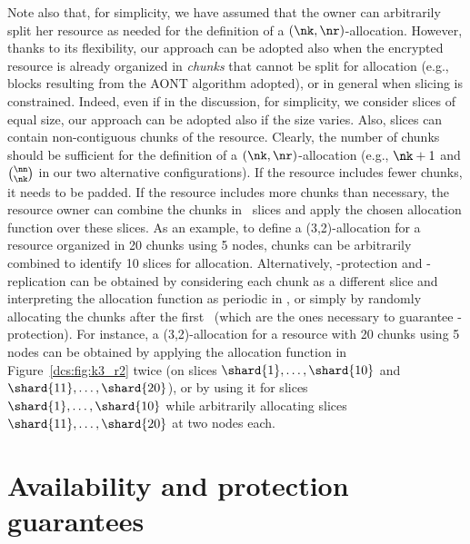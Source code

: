 Note also that, for simplicity, we have assumed that the owner can
arbitrarily split her resource as needed for the definition of a
$(\nk,\nr)$-allocation. However, thanks to its flexibility, our
approach can be adopted also when the encrypted resource is already
organized in {\em chunks} that cannot be split for allocation (e.g.,
blocks resulting from the AONT algorithm adopted), or in general when
slicing is constrained. Indeed, even if in the discussion, for
simplicity, we consider slices of equal size, our approach can be
adopted also if the size varies.  Also, slices can contain
non-contiguous chunks of the resource. Clearly, the number of chunks
should be sufficient for the definition of a $(\nk,\nr)$-allocation
(e.g., $\nk+1$ and $\binom{\nn}{\nk}$ in our two alternative
configurations). If the resource includes fewer chunks, it needs to be
padded. If the resource includes more chunks than necessary, the
resource owner can combine the chunks in \ns\ slices and apply the
chosen allocation function over these slices. As an example, to define
a (3,2)-allocation for a resource organized in 20 chunks using 5
nodes, chunks can be arbitrarily combined to identify 10 slices for
allocation. Alternatively, \nk-protection and \nr-replication can be
obtained by considering each chunk as a different slice and
interpreting the allocation function as periodic in \ns, or simply by
randomly allocating the chunks after the first \ns\ (which are the
ones necessary to guarantee \nk-protection). For instance, a
(3,2)-allocation for a resource with 20 chunks using 5 nodes can be
obtained by applying the allocation function in Figure~\ref{dcs:fig:k3_r2}
twice (on slices $\shard{1},\ldots,\shard{10}$ and
$\shard{11},\ldots,\shard{20}$), or by using it for slices
$\shard{1},\ldots,\shard{10}$ while arbitrarily allocating slices
$\shard{11},\ldots,\shard{20}$ at two nodes each.


\section[Guarantees]{Availability and protection guarantees}\label{dcs:sec:analysis}

